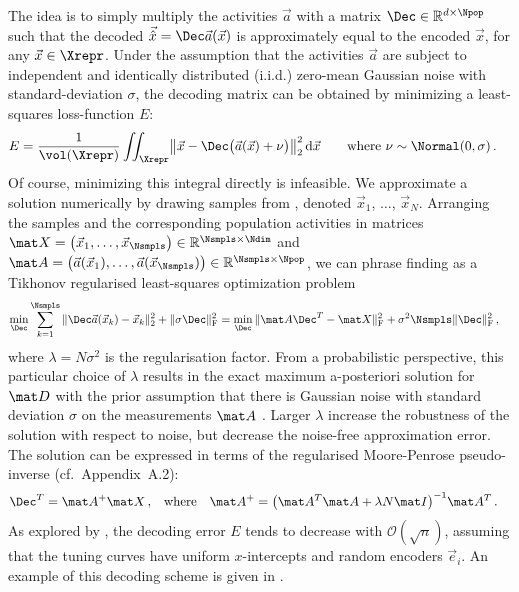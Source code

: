 The idea is to simply multiply the activities $\vec a$ with a matrix $\Dec \in \mathbb{R}^{d \times \Npop}$ such that the decoded $\vec{\hat x} = \Dec \vec a(\vec x)$ is approximately equal to the encoded $\vec x$, for any $\vec x \in \Xrepr$.
Under the assumption that the activities $\vec a$ are subject to independent and identically distributed (i.i.d.) zero-mean Gaussian noise with standard-deviation $\sigma$, the decoding matrix \Dec can be obtained by minimizing a least-squares loss-function $E$:
\begin{align}
	E &= \frac{1}{\vol(\Xrepr)} \iint_{\Xrepr} \bigl\| \vec x - \Dec \bigl( \vec a(\vec x) + \nu \bigr) \bigr\|_2^2  \, \mathrm{d}\vec{x} \quad\quad \text{where } \nu \sim \Normal(0, \sigma) \,.
	\label{eqn:lstsq_loss_identity}
\end{align}
Of course, minimizing this integral directly is infeasible.
We approximate a solution numerically by drawing \Nsmpls samples from \Xrepr, denoted $\vec x_1$, $\ldots$, $\vec x_N$.
Arranging the samples and the corresponding population activities in matrices $\mat X = \begin{pmatrix} \vec x_1, \ldots, \vec x_{\Nsmpls} \end{pmatrix} \in \mathbb{R}^{\Nsmpls \times \Ndim}$ and $\mat A = \begin{pmatrix}\vec a(\vec x_1), \ldots, \vec a(\vec x_{\Nsmpls})\end{pmatrix} \in \mathbb{R}^{\Nsmpls \times \Npop}$, we can phrase finding \Dec as a Tikhonov regularised least-squares optimization problem
\begin{align}
\min_{\Dec} \sum_{k = 1}^{\Nsmpls} \| \Dec \vec a(\vec x_k) - \vec x_k \|_2^2  + \| \sigma \Dec \|^2_\mathrm{F}
&= \min_{\Dec} \| \mat A \Dec^T - \mat X \|_\mathrm{F}^2 + \sigma^2 \Nsmpls \| \Dec \|_\mathrm{F}^2 \,,
\end{align}
where $\lambda = N \sigma^2$ is the regularisation factor.
From a probabilistic perspective, this particular choice of $\lambda$ results in the exact maximum a-posteriori solution for $\mat D$ with the prior assumption that there is Gaussian noise with standard deviation $\sigma$ on the measurements $\mat A$ \citep[Chapter~6]{boyd2004convex}. 
Larger $\lambda$ increase the robustness of the solution with respect to noise, but decrease the noise-free approximation error.
The solution can be expressed in terms of the regularised Moore-Penrose pseudo-inverse (cf.~Appendix~A.2):
\begin{align}
\Dec^T &= \mat A^+ \mat X \,, &\text{where} \quad \mat A^+ &= \bigl(\mat A^T \mat A + \lambda N \mat I \bigr)^{-1} \mat A^T \,.
\label{eqn:decoding}
\end{align}
As explored by \citet[Chapter~2]{eliasmith2003neural}, the decoding error $E$ tends to decrease with $\mathcal{O}(\sqrt{n})$, assuming that the tuning curves have uniform $x$-intercepts and random encoders $\vec e_i$.
An example of this decoding scheme is given in .

